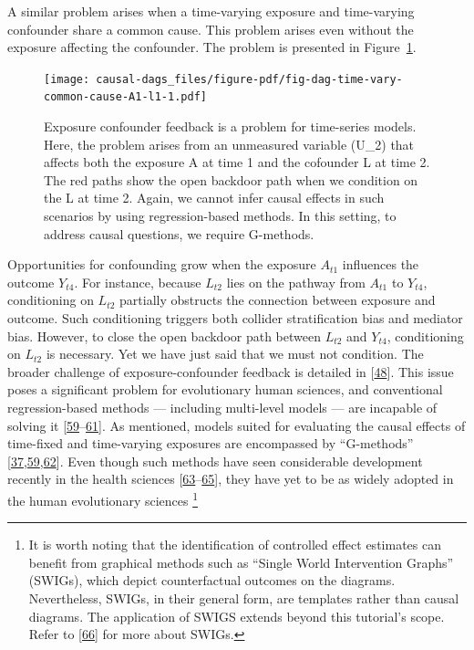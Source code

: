 \documentclass[
  singlecolumn]{article}
\begin{document}
A similar problem arises when a time-varying exposure and time-varying
confounder share a common cause. This problem arises even without the
exposure affecting the confounder. The problem is presented in
Figure~\ref{fig-dag-time-vary-common-cause-A1-l1}.

\begin{figure}

{\centering \texttt{[image: causal-dags\_files/figure-pdf/fig-dag-time-vary-common-cause-A1-l1-1.pdf]}

}

\caption{\label{fig-dag-time-vary-common-cause-A1-l1}Exposure confounder
feedback is a problem for time-series models. Here, the problem arises
from an unmeasured variable (U\_2) that affects both the exposure A at
time 1 and the cofounder L at time 2. The red paths show the open
backdoor path when we condition on the L at time 2. Again, we cannot
infer causal effects in such scenarios by using regression-based
methods. In this setting, to address causal questions, we require
G-methods.}

\end{figure}

Opportunities for confounding grow when the exposure \(A_{t1}\)
influences the outcome \(Y_{t4}\). For instance, because \(L_{t2}\) lies
on the pathway from \(A_{t1}\) to \(Y_{t4}\), conditioning on \(L_{t2}\)
partially obstructs the connection between exposure and outcome. Such
conditioning triggers both collider stratification bias and mediator
bias. However, to close the open backdoor path between \(L_{t2}\) and
\(Y_{t4}\), conditioning on \(L_{t2}\) is necessary. Yet we have just
said that we must not condition. The broader challenge of
exposure-confounder feedback is detailed in
{[}\protect\hyperlink{ref-hernuxe1n2023a}{48}{]}. This issue poses a
significant problem for evolutionary human sciences, and conventional
regression-based methods --- including multi-level models --- are
incapable of solving it
{[}\protect\hyperlink{ref-hernuxe1n2006}{59}--\protect\hyperlink{ref-robins1986}{61}{]}.
As mentioned, models suited for evaluating the causal effects of
time-fixed and time-varying exposures are encompassed by ``G-methods''
{[}\protect\hyperlink{ref-chatton2020}{37},\protect\hyperlink{ref-hernuxe1n2006}{59},\protect\hyperlink{ref-naimi2017}{62}{]}.
Even though such methods have seen considerable development recently in
the health sciences
{[}\protect\hyperlink{ref-williams2021}{63}--\protect\hyperlink{ref-breskin2020}{65}{]},
they have yet to be as widely adopted in the human evolutionary sciences
\footnote{It is worth noting that the identification of controlled
  effect estimates can benefit from graphical methods such as ``Single
  World Intervention Graphs'' (SWIGs), which depict counterfactual
  outcomes on the diagrams. Nevertheless, SWIGs, in their general form,
  are templates rather than causal diagrams. The application of SWIGS
  extends beyond this tutorial's scope. Refer to
  {[}\protect\hyperlink{ref-richardson2013}{66}{]} for more about SWIGs.}
\end{document}
